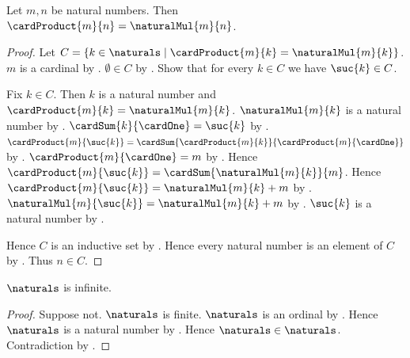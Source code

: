 \begin{theorem}\label{cardinal_product_natural_numbers}
    Let $m,n$ be natural numbers.
    Then $\cardProduct{m}{n}=\naturalMul{m}{n}$.
\end{theorem}
\begin{proof}
    Let $C=\{k\in\naturals\mid
        \text{$\cardProduct{m}{k}=\naturalMul{m}{k}$}\}$.
    $m$ is a cardinal by .
    $\emptyset\in C$
        by
        .
    Show that for every $k\in C$ we have $\suc{k}\in C$.
    \begin{subproof}
        Fix $k\in C$.
        Then $k$ is a natural number and
            $\cardProduct{m}{k}=\naturalMul{m}{k}$.
        $\naturalMul{m}{k}$ is a natural number
            by .
        $\cardSum{k}{\cardOne}=\suc{k}$
            by .
        $\cardProduct{m}{\suc{k}}
            =\cardSum{\cardProduct{m}{k}}
                {\cardProduct{m}{\cardOne}}$
            by .
        $\cardProduct{m}{\cardOne}=m$
            by .
        Hence $\cardProduct{m}{\suc{k}}
            =\cardSum{\naturalMul{m}{k}}{m}$.
        Hence $\cardProduct{m}{\suc{k}}
            =\naturalMul{m}{k}+m$
            by .
        $\naturalMul{m}{\suc{k}}=\naturalMul{m}{k}+m$
            by .
        $\suc{k}$ is a natural number by .
    \end{subproof}
    Hence $C$ is an inductive set by .
    Hence every natural number is an element of $C$
        by .
    Thus $n\in C$.
\end{proof}

\begin{theorem}\label{naturals_is_infinite}
    $\naturals$ is infinite.
\end{theorem}
\begin{proof}
    Suppose not.
    $\naturals$ is finite.
    $\naturals$ is an ordinal by .
    Hence $\naturals$ is a natural number
        by .
    Hence $\naturals\in\naturals$.
    Contradiction by .
\end{proof}

